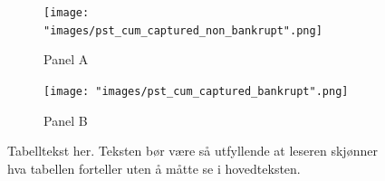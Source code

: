 \begin{figure}[h]
  	\begin{center}
  	\label{fig:simulation_proportions}
  	\captionsetup{justification=centering}
  	 \begin{subfigure}[t]{0.47\linewidth}
  	 \vspace{0.4cm}
  	        \caption*{\large Panel A}
  	        \vspace{-0.3cm}
    		\texttt{[image: "images/pst\_cum\_captured\_non\_bankrupt".png]}
  	\end{subfigure}
 	\begin{subfigure}[t]{0.47\linewidth}
 	\vspace{0.4cm}
            \caption*{\large Panel B}
            \vspace{-0.3cm}
    		\texttt{[image: "images/pst\_cum\_captured\_bankrupt".png]}
  	\end{subfigure}
  	\vspace{-0.6cm}
  	\end{center}
  \caption*{Tabelltekst her. Teksten bør være så utfyllende at leseren skjønner hva tabellen forteller uten å måtte se i hovedteksten.}
\end{figure}